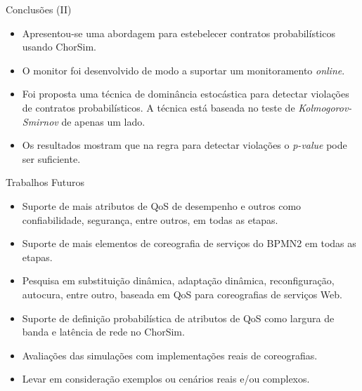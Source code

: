 \documentclass[xcolor=svgnames]{beamer}
\begin{document}
  \begin{frame}{Conclusões (II)}
      \begin{itemize}
	\item Apresentou-se uma abordagem para estebelecer contratos probabilísticos usando ChorSim.
	\item O monitor foi desenvolvido de modo a suportar um monitoramento \textit{online}.
	\item Foi proposta uma técnica de dominância estocástica para detectar violações de contratos probabilísticos. 
	  A técnica está baseada no teste de \textit{Kolmogorov-Smirnov} de apenas um lado.
	\item Os resultados mostram que na regra para detectar violações o \textit{p-value} pode ser suficiente.
      \end{itemize}
  \end{frame}

  \begin{frame}{Trabalhos Futuros}
      \begin{itemize}
	\item Suporte de mais atributos de QoS de desempenho e outros como confiabilidade, segurança, entre outros, em todas as etapas.
	\item Suporte de mais elementos de coreografia de serviços do BPMN2 em todas as etapas.
	\item Pesquisa em  substituição dinâmica, adaptação dinâmica, reconfiguração, autocura, entre outro,  baseada em QoS para coreografias de serviços Web.
	\item Suporte de definição probabilística de atributos de QoS como largura de banda e latência de rede no ChorSim.
	\item Avaliações das simulações com implementações reais de coreografias.
	\item Levar em consideração exemplos ou cenários reais e/ou complexos.
      \end{itemize}
  \end{frame}
  







\end{document}
